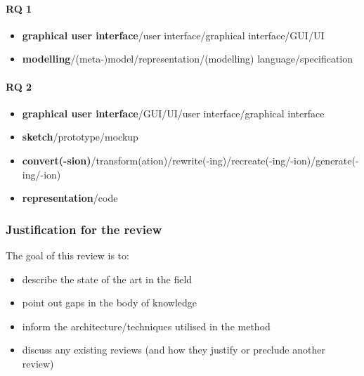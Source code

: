\paragraph{RQ 1}

\begin{itemize}
    \item \textbf{graphical user interface}/user interface/graphical interface/GUI/UI
    \item \textbf{modelling}/(meta-)model/representation/(modelling) language/specification
\end{itemize}

\paragraph{RQ 2}

\begin{itemize}
    \item \textbf{graphical user interface}/GUI/UI/user interface/graphical interface
    \item \textbf{sketch}/prototype/mockup
    \item \textbf{convert(-sion)}/transform(ation)/rewrite(-ing)/recreate(-ing/-ion)/generate(-ing/-ion)
    \item \textbf{representation}/code
\end{itemize}

\subsubsection[Justification]{Justification for the review}

The goal of this review is to:
\begin{itemize}
    \item describe the state of the art in the field
    \item point out gaps in the body of knowledge
    \item inform the architecture/techniques utilised in the method
    \item discuss any existing reviews (and how they justify or preclude another review)
\end{itemize}

